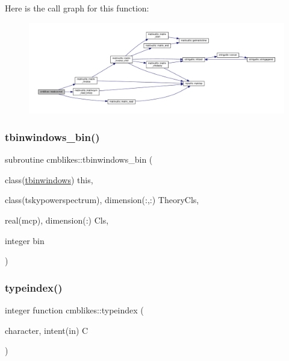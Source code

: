 Here is the call graph for this function\+:
\nopagebreak
\begin{figure}[H]
\begin{center}
\leavevmode
\includegraphics[width=350pt]{namespacecmblikes_a53d98d3cf4a8d20dca8c46be7bd33329_cgraph}
\end{center}
\end{figure}
\mbox{\label{namespacecmblikes_a84faea71532b47138544e07bf77a7fb0}} 
\subsubsection{\texorpdfstring{tbinwindows\+\_\+bin()}{tbinwindows\_bin()}}
{\footnotesize\ttfamily subroutine cmblikes\+::tbinwindows\+\_\+bin (\begin{DoxyParamCaption}\item[{class(\mbox{\hyperlink{structcmblikes_1_1tbinwindows}{tbinwindows}})}]{this,  }\item[{class(tskypowerspectrum), dimension(\+:,\+:)}]{Theory\+Cls,  }\item[{real(mcp), dimension(\+:)}]{Cls,  }\item[{integer}]{bin }\end{DoxyParamCaption})\hspace{0.3cm}{\ttfamily [private]}}

\mbox{\label{namespacecmblikes_a957c1b188c2225799d8fb439858c73d6}} 
\subsubsection{\texorpdfstring{typeindex()}{typeindex()}}
{\footnotesize\ttfamily integer function cmblikes\+::typeindex (\begin{DoxyParamCaption}\item[{character, intent(in)}]{C }\end{DoxyParamCaption})\hspace{0.3cm}{\ttfamily [private]}}



